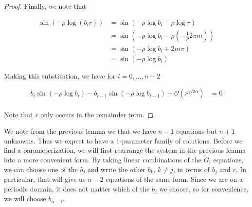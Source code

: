 \documentclass[thesis.tex]{subfiles}
\begin{document}
\begin{lemma}
\begin{proof}
Finally, we note that

\begin{align*}
\sin \left( -\rho \log (b_i r) \right)
&= \sin \left( -\rho \log b_i - \rho \log r  \right) \\
&= \sin \left( -\rho \log b_i - \rho \left( -\frac{1}{\rho}2\pi m \right) \right) \\
&= \sin \left( -\rho \log b_i + 2 m \pi \right) \\
&= \sin \left( -\rho \log b_i \right) 
\end{align*}

Making this substitution, we have for $i = 0, \dots, n-2$

\begin{align}\label{diff3}
b_i \sin \left( -\rho \log b_i \right) - b_{i-1} \sin \left( -\rho \log b_{i-1} \right) + \mathcal{O}(r^{\gamma / 2 \alpha}) &= 0 \\
\end{align}

Note that $r$ only occurs in the remainder term. 

\end{proof}
\end{lemma}

We note from the previous lemma we that we have $n-1$ equations but $n+1$ unknowns. Thus we expect to have a 1-parameter family of solutions. Before we find a parameterization, we will first rearrange the system in the previous lemma into a more convenient form. By taking linear combinations of the $\tilde{G}_i$ equations, we can choose one of the $b_j$ and write the other $b_k$, $k \neq j$, in terms of $b_j$ and $r$. In particular, that will give us $n-2$ equations of the same form. Since we are on a periodic domain, it does not matter which of the $b_j$ we choose, so for convenience, we will choose $b_{n-1}$.

\end{document}
